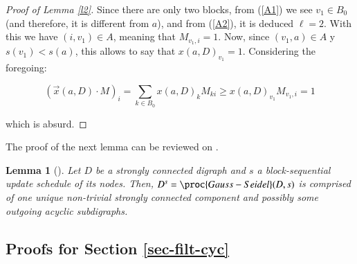 \documentclass[preprint,12pt]{elsarticle}
\newtheorem {lema}[teo]{Lemma}
\begin{document}
\begin{proof}[{Proof of Lemma \ref{l2}}]
Since there are only two blocks, from (\ref{A1}) we see $v_1 \in B_0$ (and therefore, it is different from $a$), and from (\ref{A2}), it is deduced $\ell=2$. With this we have $(i,v_1) \in A$, meaning that $M_{v_1,i}=1$. Now, since $(v_1,a) \in A$ y $s(v_1) < s(a)$, this allows to say that $x(a,D)_{v_1}=1$. Considering the foregoing:

$$(\vec{x}(a,D)\cdot M)_i=\sum_{k \in B_0} x(a,D)_k M_{ki} \geq x(a,D)_{v_1} M_{v_1,i}=1$$

which is absurd.

\end{proof}

The proof of the next lemma can be reviewed on \cite{disj}.
\begin{lema}[\cite{disj}]\label{cfc}
Let $D$ be a strongly connected digraph and $s$ a block-sequential update schedule of its nodes. Then, $D^s=\proc{Gauss-Seidel}(D,s)$ is comprised of one unique non-trivial strongly connected component and possibly some outgoing acyclic subdigraphs. 
\end{lema}

\subsection{Proofs for Section \ref{sec-filt-cyc}}
\end{document}
